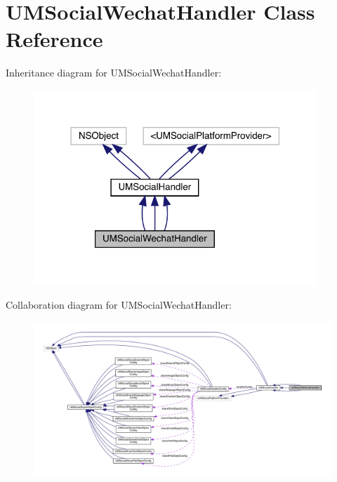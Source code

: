 \hypertarget{interface_u_m_social_wechat_handler}{}\section{U\+M\+Social\+Wechat\+Handler Class Reference}
\label{interface_u_m_social_wechat_handler}


Inheritance diagram for U\+M\+Social\+Wechat\+Handler\+:\nopagebreak
\begin{figure}[H]
\begin{center}
\leavevmode
\includegraphics[width=302pt]{interface_u_m_social_wechat_handler__inherit__graph}
\end{center}
\end{figure}


Collaboration diagram for U\+M\+Social\+Wechat\+Handler\+:\nopagebreak
\begin{figure}[H]
\begin{center}
\leavevmode
\includegraphics[width=350pt]{interface_u_m_social_wechat_handler__coll__graph}
\end{center}
\end{figure}
